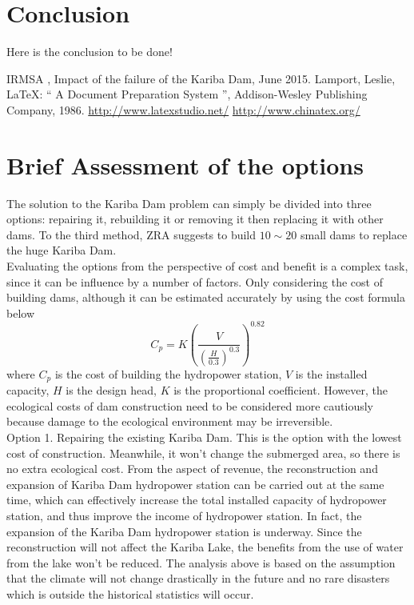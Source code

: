 \documentclass{mcmthesis}
\begin{document}
\section{Conclusion}
\indent \indent Here is the conclusion to be done!

\begin{thebibliography}{99}
 IRMSA , Impact of the failure of the Kariba Dam, June 2015.
Lamport, Leslie,  \LaTeX{}: `` A Document Preparation System '',
Addison-Wesley Publishing Company, 1986.
\url{http://www.latexstudio.net/}
\url{http://www.chinatex.org/}
\end{thebibliography}

\clearpage
\section{Brief Assessment of the options}
\indent \indent The solution to the Kariba Dam problem can simply be divided into three options: repairing it, rebuilding it or removing it then replacing it with other dams. To the third method, ZRA suggests to build $10\sim20$ small dams to replace the huge Kariba Dam.\\
\indent Evaluating the options from the perspective of cost and benefit is a complex task, since it can be influence by a number of factors. Only considering the cost of building dams, although it can be estimated accurately by using the cost formula below \\
\[
C_{p} = K\left(\frac{V}{\left(\frac{H}{0.3}\right)^{0.3}}\right)^{0.82}
\]
where $C_{p}$ is the cost of building the hydropower station, $V$ is the installed capacity, $H$ is the design head, $K$ is the proportional coefficient. However, the ecological costs of dam construction need to be considered more cautiously because damage to the ecological environment may be irreversible.\\
\indent Option 1. Repairing the existing Kariba Dam. This is the option with the lowest cost of construction. Meanwhile, it won't change the submerged area, so there is no extra ecological cost. From the aspect of revenue, the reconstruction and expansion of Kariba Dam hydropower station can be carried out at the same time, which can effectively increase the total installed capacity of hydropower station, and thus improve the income of hydropower station. In fact, the expansion of the Kariba Dam hydropower station is underway. Since the reconstruction will not affect the Kariba Lake, the benefits from the use of water from the lake won't be reduced. The analysis above is based on the assumption that the climate will not change drastically in the future and no rare disasters which is outside the historical statistics will occur.\\
\end{document}
